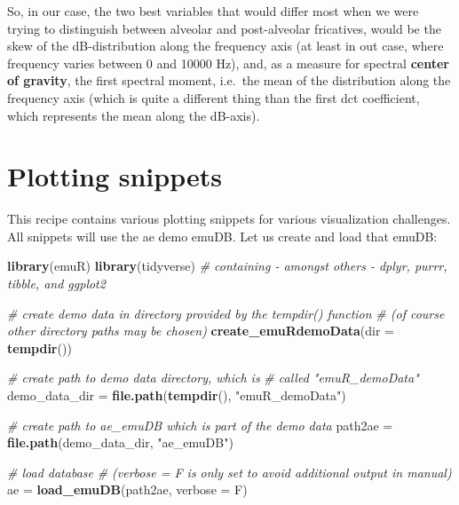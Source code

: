 \documentclass[]{book}
\newenvironment{Shaded}{\begin{snugshade}}{\end{snugshade}}
\newcommand{\CommentTok}[1]{\textcolor[rgb]{0.56,0.35,0.01}{\textit{#1}}}
\newcommand{\DataTypeTok}[1]{\textcolor[rgb]{0.13,0.29,0.53}{#1}}
\newcommand{\KeywordTok}[1]{\textcolor[rgb]{0.13,0.29,0.53}{\textbf{#1}}}
\newcommand{\NormalTok}[1]{#1}
\newcommand{\StringTok}[1]{\textcolor[rgb]{0.31,0.60,0.02}{#1}}
\begin{document}
So, in our case, the two best variables that would differ most when we were trying to distinguish between alveolar and post-alveolar fricatives, would be the skew of the dB-distribution along the frequency axis (at least in out case, where frequency varies between 0 and 10000 Hz), and, as a measure for spectral \textbf{center of gravity}, the first spectral moment, i.e.~the mean of the distribution along the frequency axis (which is quite a different thing than the first dct coefficient, which represents the mean along the dB-axis).

\hypertarget{recipe:plottingSnippets}{%
\chapter{Plotting snippets}\label{recipe:plottingSnippets}}

This recipe contains various plotting snippets for various visualization challenges. All snippets will use the ae demo emuDB. Let us create and load that emuDB:

\begin{Shaded}
\begin{Highlighting}[]
\KeywordTok{library}\NormalTok{(emuR)}
\KeywordTok{library}\NormalTok{(tidyverse) }\CommentTok{# containing - amongst others - dplyr, purrr, tibble, and ggplot2}

\CommentTok{# create demo data in directory provided by the tempdir() function}
\CommentTok{# (of course other directory paths may be chosen)}
\KeywordTok{create_emuRdemoData}\NormalTok{(}\DataTypeTok{dir =} \KeywordTok{tempdir}\NormalTok{())}

\CommentTok{# create path to demo data directory, which is}
\CommentTok{# called "emuR_demoData"}
\NormalTok{demo_data_dir =}\StringTok{ }\KeywordTok{file.path}\NormalTok{(}\KeywordTok{tempdir}\NormalTok{(), }
                          \StringTok{"emuR_demoData"}\NormalTok{)}

\CommentTok{# create path to ae_emuDB which is part of the demo data}
\NormalTok{path2ae =}\StringTok{ }\KeywordTok{file.path}\NormalTok{(demo_data_dir, }
                    \StringTok{"ae_emuDB"}\NormalTok{)}

\CommentTok{# load database}
\CommentTok{# (verbose = F is only set to avoid additional output in manual)}
\NormalTok{ae =}\StringTok{ }\KeywordTok{load_emuDB}\NormalTok{(path2ae, }\DataTypeTok{verbose =}\NormalTok{ F)}
\end{Highlighting}
\end{Shaded}
\end{document}
